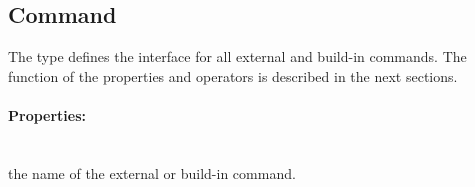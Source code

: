 \subsection{Command} 

%

The  type defines the interface for all external and
build-in commands. The function of the properties and operators is described
in the next sections.

\paragraph{Properties:}

\begin{asparadesc}
%
\item[\code{theName}] \hfill \\
the name of the external or build-in command.
%
\end{asparadesc}



